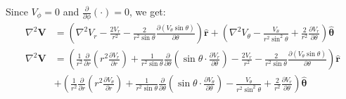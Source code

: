 \documentclass[MSc,beforeExam]{iitcsthesis}
\newcommand{\deriv}[2]{\frac{\partial #1}{\partial #2}}
\newcommand\Laplacian{\nabla^2}
\newcommand\bV{\boldsymbol{V}}
\newcommand\br{\boldsymbol{r}}
\newcommand\brhat{\hat{\br}}
\newcommand\btheta{\boldsymbol{\theta}}
\newcommand\bthetahat{\hat{\btheta}}
\begin{document}
Since $V_\phi = 0$ and $\deriv{}{\phi}(\cdot) = 0$, we get:
\begin{align} \nonumber
\Laplacian \bV &= \left(\Laplacian V_r - \frac{2V_r}{r^2} - \frac{2}{r^2 \sin\theta} \deriv{\left(V_\theta \sin\theta \right)}{\theta}\right)\brhat
+
\left(\Laplacian V_\theta - \frac{V_\theta}{r^2 \sin^2\theta} + \frac{2}{r^2}\deriv{V_r}{\theta}\right) \bthetahat
\\
\Laplacian \bV &= \left(
\frac{1}{r^2}\deriv{}{r}\left( r^2 \deriv{V_r}{r} \right) + \frac{1}{r^2 \sin\theta} \deriv{}{\theta} \left( \sin\theta \cdot \deriv{V_r}{\theta}\right)
 - \frac{2V_r}{r^2} - \frac{2}{r^2 \sin\theta} \deriv{\left(V_\theta \sin\theta \right)}{\theta}\right)\brhat \\ \nonumber
&+ \left(
\frac{1}{r^2}\deriv{}{r}\left( r^2 \deriv{V_\theta}{r} \right) + \frac{1}{r^2 \sin\theta} \deriv{}{\theta} \left( \sin\theta \cdot \deriv{V_\theta}{\theta}\right)
 - \frac{V_\theta}{r^2 \sin^2\theta} + \frac{2}{r^2}\deriv{V_r}{\theta}\right) \bthetahat
\end{align}

\clearpage
{}




%

\end{document}
